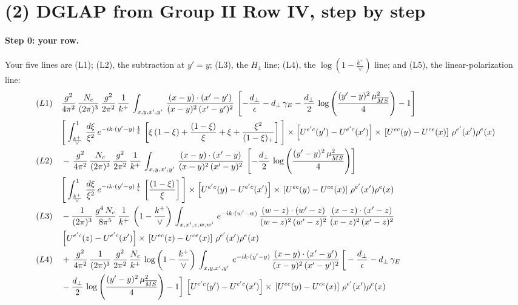 \documentclass[10pt]{article}
\numberwithin{equation}{section}
\begin{document}
\section{(2) DGLAP from Group II Row IV, step by step}\label{sec:dglap}
\paragraph{Step 0: your row.} Your five lines are (L1); (L2), the subtraction at $y'=y$; (L3), the $H_4$ line; (L4), the $\log(1-\frac{k^+}{\vee})$ line; and (L5), the linear-polarization line:
\begin{align}
(L1)\quad &   \frac{g^{2}}{4\pi^{2}}\, \frac{N_{c}}{(2\pi)^{3}}\,\frac{g^{2}}{2\pi^{2}}\, \frac{1}{k^{+}}\,\int_{x,y,x',y'}\,\frac{(x-y)\cdot (x'-y')}{(x-y)^{2}\,(x'-y')^{2}}\,\left[-\frac{d_{\perp}}{\epsilon}-d_{\perp}\,\gamma_{E}-\frac{d_{\perp}}{2}\,\log{\left(\frac{(y'-y)^{2}\,\mu^{2}_{\overline{MS}}}{4}\right)}-1\right]\,\notag \\ & \Bigg[\int_{\frac{k^{+}}{\vee}}^{1}\,\frac{d\xi}{\xi^{2}}\,e^{-ik\cdot (y'-y)\,\frac{1}{\xi}}\,\left[\xi\,(1-\xi)+\frac{(1-\xi)}{\xi}+\xi+\frac{\xi^{2}}{(1-\xi)_{+}}\right]\Bigg]\times \left[U^{e'c}(y') - U^{e'c}(x')\right] \times\, \left[U^{ec}(y) - U^{ce}(x)\right]\, \rho^{e'}(x') \rho^{e}(x)\notag\\
(L2)\quad&   -\,\frac{g^{2}}{4\pi^{2}}\, \frac{N_{c}}{(2\pi)^{3}}\,\frac{g^{2}}{2\pi^{2}}\, \frac{1}{k^{+}}\,\int_{x,y,x',y'}\,\frac{(x-y)\cdot (x'-y)}{(x-y)^{2}\,(x'-y)^{2}}\,\left[-\frac{d_{\perp}}{2}\,\log{\left(\frac{(y'-y)^{2}\,\mu^{2}_{\overline{MS}}}{4}\right)}\right]\,\notag \\ &  \Bigg[\int_{\frac{k^{+}}{\vee}}^{1}\,\frac{d\xi}{\xi^{2}}\,e^{-ik\cdot (y'-y)\,\frac{1}{\xi}}\,\left[\frac{(1-\xi)}{\xi}\right]\Bigg]\times \left[U^{e'c}(y) - U^{e'c}(x')\right] \times\, \left[U^{ec}(y) - U^{ce}(x)\right]\, \rho^{e'}(x') \rho^{e}(x)\notag\\
(L3)\quad&   -\frac{1}{(2\pi)^{3}}\,\frac{g^{4}\,N_{c}}{8\pi^{5}}\,\frac{1}{k^{+}}\,\left(1-\frac{k^{+}}{\vee}\right)\,\int_{x,x',z,w,w'}\,e^{-ik\cdot (w'-w)}\,\frac{(w-z)\cdot(w'-z)}{(w-z)^{2}\,(w'-z)^{2}}\,\frac{(x-z)\cdot(x'-z)}{(x-z)^{2}\,(x'-z)^{2}}\notag\\
& \left[U^{e'c}(z) - U^{e'c}(x')\right] \times\, \left[U^{ec}(z) - U^{ce}(x)\right]\, \rho^{e'}(x') \rho^{e}(x)\notag\\
(L4)\quad&  +\, \frac{g^{2}}{4\pi^{2}}\, \frac{1}{(2\pi)^{3}}\,\frac{g^{2}}{2\pi^{2}}\, \frac{N_{c}}{k^{+}}\,\log{\left(1-\frac{k^{+}}{\vee}\right)}\,\int_{x,y,x',y'}\,e^{-ik\cdot (y'-y)}\,\frac{(x-y)\cdot (x'-y')}{(x-y)^{2}\,(x'-y')^{2}}\,\bigg[-\frac{d_{\perp}}{\epsilon}-d_{\perp}\,\gamma_{E}\notag \\ & -\frac{d_{\perp}}{2}\,\log{\left(\frac{(y'-y)^{2}\,\mu^{2}_{\overline{MS}}}{4}\right)}-1\bigg]\,\left[U^{e'c}(y') - U^{e'c}(x')\right] \times\, \left[U^{ec}(y) - U^{ce}(x)\right]\, \rho^{e'}(x') \rho^{e}(x)\notag\\

\end{align}
\end{document}
